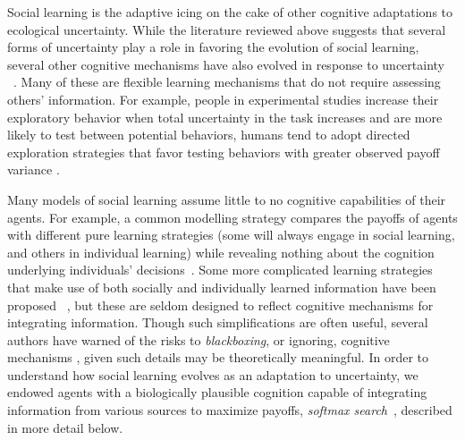 \documentclass[letterpaper,11.5pt]{scrartcl}
\newcommand{\cm}[1]{{\textcolor{mypurple} {({\tiny CM:} #1)}}}
\begin{document}
Social learning is the adaptive icing on the cake of other cognitive adaptations
to ecological uncertainty.  While the literature reviewed above suggests that
several forms of uncertainty play a role in favoring the evolution of social
learning, several other cognitive mechanisms have also evolved in response to
uncertainty ~\cite{volz2012}. Many of these are flexible learning mechanisms that
do not require assessing others' information. For example, people in experimental
studies increase their exploratory behavior when total uncertainty in the task
increases and are more likely to test %
between potential behaviors, humans tend to adopt directed exploration strategies
that favor testing behaviors with greater observed payoff variance
\cite{Wilson2014,Gershman2019}.

Many models of social learning assume little to no cognitive capabilities
of their agents. For example, a common modelling strategy compares the payoffs of
agents with different pure learning strategies (some will always engage in social
learning, and others in individual learning) while revealing nothing about the
cognition underlying individuals' decisions~\cite{BoydRicherson1985, Rogers1988,
aoki2005}. Some more complicated learning strategies that make use of both
socially and individually learned information have been proposed
~\cite{Enquist2007, perreault2012bayesian}, but these are seldom designed to
reflect cognitive mechanisms for integrating information. Though such
simplifications are often useful, several authors have warned of the risks to
\emph{blackboxing}, or ignoring, cognitive mechanisms \cite[p. 658]{Heyes2016,
Kendal2018}, given such details may be theoretically meaningful. In order to
understand how social learning evolves as an adaptation to uncertainty, we 
endowed agents with a biologically plausible cognition capable of integrating
information from various sources to maximize payoffs, \emph{softmax
search}~\cite{Gershman2019}, described in more detail below. 
\end{document}
